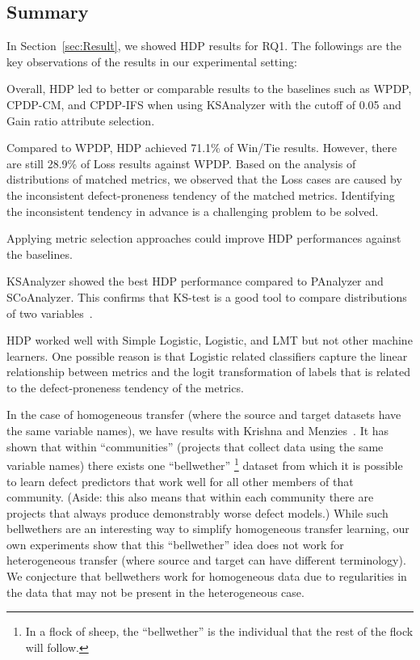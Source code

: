 \subsection{Summary}
In Section~\ref{sec:Result}, we showed HDP results for RQ1. The followings are the key observations of the results in our experimental setting:
\squishlist
    \item Overall, HDP led to better or comparable results to the baselines such as WPDP, CPDP-CM, and CPDP-IFS when using KSAnalyzer with the cutoff of 0.05 and Gain ratio attribute selection.
    \item Compared to WPDP, HDP achieved 71.1\% of Win/Tie results. However, there are still 28.9\% of Loss results against WPDP. Based on the analysis of distributions of matched metrics, we observed that the Loss cases are caused by the inconsistent defect-proneness tendency of the matched metrics. Identifying the inconsistent tendency in advance is a challenging problem to be solved.
    \item Applying metric selection approaches could improve HDP performances against the baselines.
    \item KSAnalyzer showed the best HDP performance compared to PAnalyzer and SCoAnalyzer. This confirms that KS-test is a good tool to compare distributions of two variables~\cite{Lilliefors67,Massey51}.
    \item HDP worked well with Simple Logistic, Logistic, and LMT but not other machine learners. One possible reason is that Logistic related classifiers capture the linear relationship between metrics and the logit transformation of labels that is related to the defect-proneness tendency of the metrics.
\squishend

In the case of homogeneous transfer (where the source and target datasets have the same variable names), we have results with Krishna and Menzies~\cite{krishna16}. It has shown that within ``communities'' (projects that collect data using the same variable names) there exists one ``bellwether'' \footnote{In a flock of sheep, the ``bellwether'' is the individual that the rest of the flock will follow.} dataset from which it is possible to learn defect predictors that work well for all other members of that community. (Aside: this also means that within each community there are projects that always produce demonstrably worse defect models.) While such bellwethers are an interesting way to simplify homogeneous transfer learning, our own experiments show that this ``bellwether'' idea does not work for heterogeneous transfer (where source and target can have different terminology). We conjecture that bellwethers work for homogeneous data due to regularities in the data that may not be present in the heterogeneous case.

